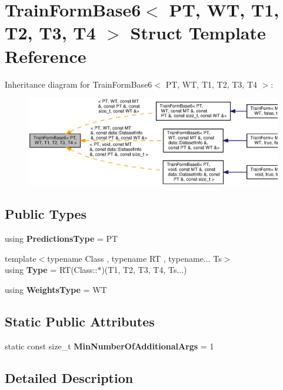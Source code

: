 \section{Train\+Form\+Base6$<$ PT, WT, T1, T2, T3, T4 $>$ Struct Template Reference}
\label{structmlpack_1_1cv_1_1TrainFormBase6}


Inheritance diagram for Train\+Form\+Base6$<$ PT, WT, T1, T2, T3, T4 $>$\+:
\nopagebreak
\begin{figure}[H]
\begin{center}
\leavevmode
\includegraphics[width=350pt]{structmlpack_1_1cv_1_1TrainFormBase6__inherit__graph}
\end{center}
\end{figure}
\subsection*{Public Types}
\begin{DoxyCompactItemize}
\item 
using \textbf{ Predictions\+Type} = PT
\item 
{\footnotesize template$<$typename Class , typename RT , typename... Ts$>$ }\\using \textbf{ Type} = RT(Class\+::$\ast$)(T1, T2, T3, T4, Ts...)
\item 
using \textbf{ Weights\+Type} = WT
\end{DoxyCompactItemize}
\subsection*{Static Public Attributes}
\begin{DoxyCompactItemize}
\item 
static const size\+\_\+t \textbf{ Min\+Number\+Of\+Additional\+Args} = 1
\end{DoxyCompactItemize}


\subsection{Detailed Description}
